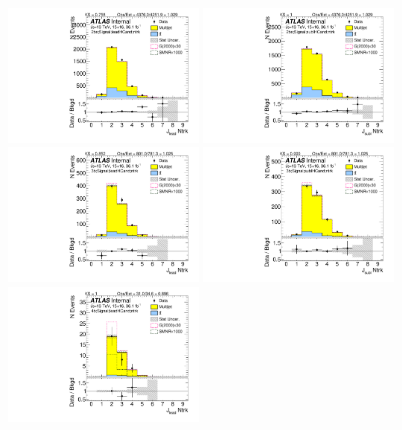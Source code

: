 \begin{figure}[htbp!]
\begin{center}
\includegraphics[width=0.45\textwidth,angle=-90]{figures/boosted/Signal/b77_TwoTag_split_Signal_leadHCand_ntrk.pdf}
\includegraphics[width=0.45\textwidth,angle=-90]{figures/boosted/Signal/b77_TwoTag_split_Signal_sublHCand_ntrk.pdf}\\
\includegraphics[width=0.45\textwidth,angle=-90]{figures/boosted/Signal/b77_ThreeTag_Signal_leadHCand_ntrk.pdf}
\includegraphics[width=0.45\textwidth,angle=-90]{figures/boosted/Signal/b77_ThreeTag_Signal_sublHCand_ntrk.pdf}\\
\includegraphics[width=0.45\textwidth,angle=-90]{figures/boosted/Signal/b77_FourTag_Signal_leadHCand_ntrk.pdf}

\end{center}
\end{figure}
